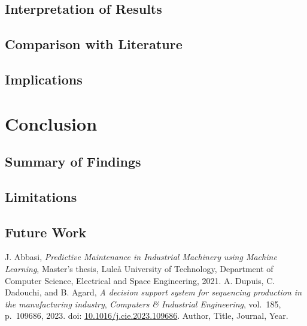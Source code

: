 \documentclass[12pt,a4paper]{report}
\begin{document}
\section{Interpretation of Results}
\section{Comparison with Literature}
\section{Implications}

\chapter{Conclusion}
\section{Summary of Findings}
\section{Limitations}
\section{Future Work}

\begin{thebibliography}{99}
J. Abbasi, \textit{Predictive Maintenance in Industrial Machinery using Machine Learning}, 
Master’s thesis, Luleå University of Technology, Department of Computer Science, Electrical and Space Engineering, 2021.
A. Dupuis, C. Dadouchi, and B. Agard, 
        \textit{A decision support system for sequencing production in the manufacturing industry},
\textit{Computers \& Industrial Engineering}, vol.~185, p.~109686, 2023. 
doi: \href{https://doi.org/10.1016/j.cie.2023.109686}{10.1016/j.cie.2023.109686}.
 Author, Title, Journal, Year.

\end{thebibliography}

\end{document}
